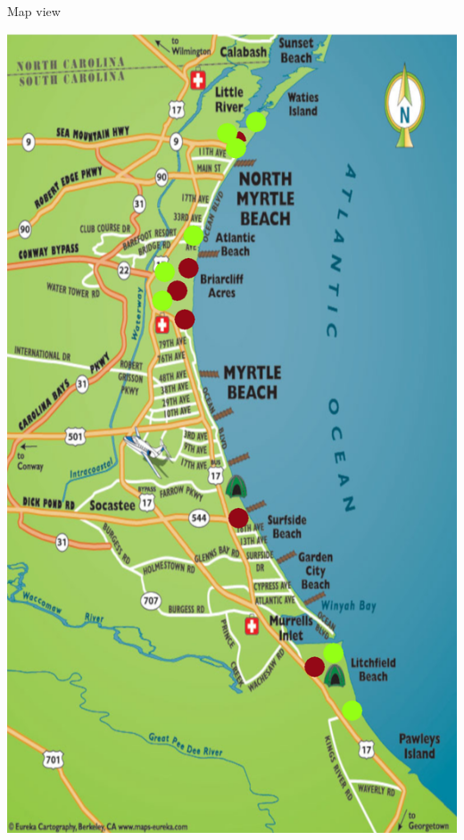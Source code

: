 \documentclass[14pt]{extarticle}
\begin{document}
\begin{minipage}{\textwidth}

{\huge Map view}

\includegraphics[width=\textwidth]{mock1.png}

\end{minipage}
\end{document}

